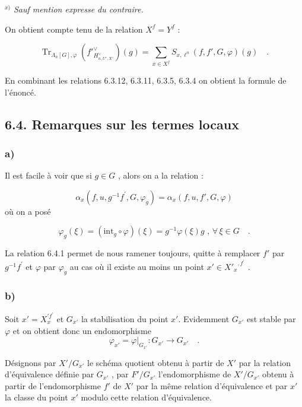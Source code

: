 \documentclass[11pt]{article}
\providecommand{\Tr}{\operatorname{Tr}}
\providecommand{\Tr}{\operatorname{Tr}}
\providecommand{\Tr}{\operatorname{Tr}}
\providecommand{\Tr}{\operatorname{Tr}}
\providecommand{\La}{\Lambda}
\providecommand{\Tr}{\operatorname{Tr}}
\begin{document}
\bigskip

$^{x)}$ \emph{Sauf mention expresse du contraire.}

\medskip

On obtient compte tenu de la relation $X^f = Y^f$ :

\begin{equation}\tag{6.3.12}
\Tr_{\La_n[G],\varphi}(f'^\vee_{H_{n,U',X'}^\vee})(g) = \sum_{x \in X^f} S_{x,\ell^n}(f, f', G, \varphi)(g) \quad .
\end{equation}

En combinant les relations 6.3.12, 6.3.11, 6.3.5, 6.3.4 on obtient la formule de l'énoncé.

\subsection*{6.4. Remarques sur les termes locaux}
\subsubsection*{a)} Il est facile à voir que si $g \in G$ , alors on a la relation :

\begin{equation}\tag{6.4.1}
\alpha_x(f,u, g^{-1}f^{\prime}, G, \varphi_g) = \alpha_x(f,u, f', G, \varphi)
\end{equation}
où on a posé

\begin{equation}\tag{6.4.2}
\varphi_g(\xi) = (\mathrm{int}_g \circ \varphi)(\xi) = g^{-1}\varphi(\xi)g \text{ , } \forall \, \xi \in G \quad .
\end{equation}

La relation 6.4.1 permet de nous ramener toujours, quitte à remplacer $f'$ par $g^{-1}f^{\prime}$ et $\varphi$ par $\varphi_g$ au cas où il existe au moins un point $x' \in {X'_x}^{,f^{\prime}}$ .

\subsubsection*{b)} Soit $x' = X_x^{'f^{\prime}}$ et $G_{x'}$ la stabilisation du point $x'$. Evidemment $G_{x'}$ est stable par $\varphi$ et on obtient donc un endomorphisme
\[
\varphi_{x'} = \varphi|_{G_{x'}} : G_{x'} \longrightarrow G_{x'} \quad .
\]

Désignons par $X'/G_{x'}$ le schéma quotient obtenu à partir de $X'$ par la relation d'équivalence définie par $G_{x'}$ , par $F'/G_{x'}$ l'endomorphisme de $X'/G_{x'}$ obtenu à partir de l'endomorphisme $f'$ de $X'$ par la même relation d'équivalence et par $x'$ la classe du point $x'$ modulo cette relation d'équivalence.
\end{document}
